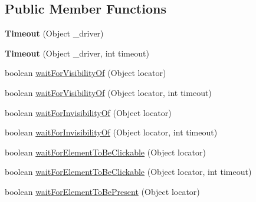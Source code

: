 \subsection*{Public Member Functions}
\begin{DoxyCompactItemize}
\item 
\hypertarget{classcom_1_1zeuslearning_1_1automation_1_1selenium_1_1interactions_1_1Timeout_a27c179d47ff7674dc3faee9ce9042bb8}{}\label{classcom_1_1zeuslearning_1_1automation_1_1selenium_1_1interactions_1_1Timeout_a27c179d47ff7674dc3faee9ce9042bb8} 
{\bfseries Timeout} (Object \+\_\+driver)
\item 
\hypertarget{classcom_1_1zeuslearning_1_1automation_1_1selenium_1_1interactions_1_1Timeout_ab55b7375c148a27ea7c585be294b1abf}{}\label{classcom_1_1zeuslearning_1_1automation_1_1selenium_1_1interactions_1_1Timeout_ab55b7375c148a27ea7c585be294b1abf} 
{\bfseries Timeout} (Object \+\_\+driver, int timeout)
\item 
boolean \hyperlink{classcom_1_1zeuslearning_1_1automation_1_1selenium_1_1interactions_1_1Timeout_a327e77cb8ede06a2f7eef9d765812b7a}{wait\+For\+Visibility\+Of} (Object locator)
\item 
boolean \hyperlink{classcom_1_1zeuslearning_1_1automation_1_1selenium_1_1interactions_1_1Timeout_ac615a524a7d7d0e00de7deabae2b6d9c}{wait\+For\+Visibility\+Of} (Object locator, int timeout)
\item 
boolean \hyperlink{classcom_1_1zeuslearning_1_1automation_1_1selenium_1_1interactions_1_1Timeout_adefb45ce06aba9bedc30a707f41ebe3f}{wait\+For\+Invisibility\+Of} (Object locator)
\item 
boolean \hyperlink{classcom_1_1zeuslearning_1_1automation_1_1selenium_1_1interactions_1_1Timeout_aa8e8bb7ba589f1c9f4fbf8fd245e3028}{wait\+For\+Invisibility\+Of} (Object locator, int timeout)
\item 
boolean \hyperlink{classcom_1_1zeuslearning_1_1automation_1_1selenium_1_1interactions_1_1Timeout_a6c5ac29cf210e232ac851ebe52b9c226}{wait\+For\+Element\+To\+Be\+Clickable} (Object locator)
\item 
boolean \hyperlink{classcom_1_1zeuslearning_1_1automation_1_1selenium_1_1interactions_1_1Timeout_a704a4c52aeb1fc87555e0f17b2a86cfe}{wait\+For\+Element\+To\+Be\+Clickable} (Object locator, int timeout)
\item 
boolean \hyperlink{classcom_1_1zeuslearning_1_1automation_1_1selenium_1_1interactions_1_1Timeout_a5b1fb9f2a2d0d61ec2b882269a3826d5}{wait\+For\+Element\+To\+Be\+Present} (Object locator)
\item 

\end{DoxyCompactItemize}
